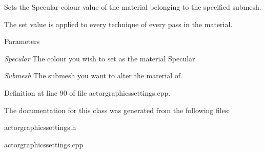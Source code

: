 Sets the Specular colour value of the material belonging to the specified submesh. 

The set value is applied to every technique of every pass in the material. 
\begin{DoxyParams}{Parameters}
\item[{\em Specular}]The colour you wish to set as the material Specular. \item[{\em Submesh}]The submesh you want to alter the material of. \end{DoxyParams}


Definition at line 90 of file actorgraphicssettings.cpp.



The documentation for this class was generated from the following files:\begin{DoxyCompactItemize}
\item 
actorgraphicssettings.h\item 
actorgraphicssettings.cpp\end{DoxyCompactItemize}
